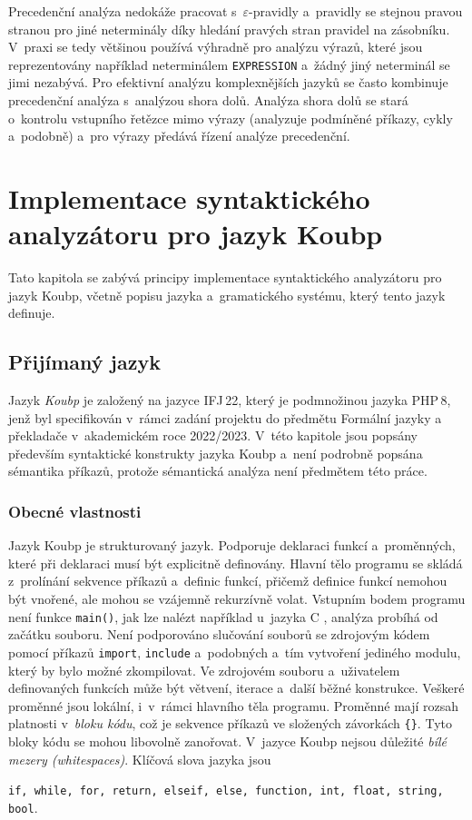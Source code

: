 Precedenční analýza nedokáže pracovat s~$\varepsilon$-pravidly a~pravidly se stejnou pravou stranou pro jiné neterminály díky hledání pravých stran pravidel na zásobníku.
V~praxi se tedy většinou používá výhradně pro analýzu výrazů, které jsou reprezentovány například neterminálem \texttt{EXPRESSION} a~žádný jiný neterminál se jimi nezabývá.
Pro efektivní analýzu komplexnějších jazyků se často kombinuje precedenční analýza s~analýzou shora dolů.
Analýza shora dolů se stará o~kontrolu vstupního řetězce mimo výrazy (analyzuje podmíněné příkazy, cykly a~podobně) a~pro výrazy předává řízení analýze precedenční.

\cleardoublepage

\chapter{Implementace syntaktického analyzátoru pro jazyk Koubp}\label{kap_implementace}

Tato kapitola se zabývá principy implementace syntaktického analyzátoru pro jazyk Koubp, včetně popisu jazyka a~gramatického systému, který tento jazyk definuje.
\section{Přijímaný jazyk}\label{kap_prijimany_jazyk}

Jazyk \emph{Koubp} je založený na jazyce IFJ\,22, který je podmnožinou jazyka PHP\,8, jenž byl specifikován v~rámci zadání projektu do předmětu Formální jazyky a překladače v~akademickém roce 2022/2023.
V~této kapitole jsou popsány především syntaktické konstrukty jazyka Koubp a~není podrobně popsána sémantika příkazů, protože sémantická analýza není předmětem této práce.

\subsection*{Obecné vlastnosti}
Jazyk Koubp je strukturovaný jazyk.
Podporuje deklaraci funkcí a~proměnných, které při deklaraci musí být explicitně definovány.
Hlavní tělo programu se skládá z~prolínání sekvence příkazů a~definic funkcí, přičemž definice funkcí nemohou být vnořené, ale mohou se vzájemně rekurzívně volat.
Vstupním bodem programu není funkce \texttt{main()}, jak lze nalézt například u~jazyka C \cite{ISO-C-Standard}, analýza probíhá od začátku souboru.
Není podporováno slučování souborů se zdrojovým kódem pomocí příkazů \texttt{import}, \texttt{include} a~podobných a~tím vytvoření jediného modulu, který by bylo možné zkompilovat.
Ve zdrojovém souboru a~uživatelem definovaných funkcích může být větvení, iterace a~další běžné konstrukce.
Veškeré proměnné jsou lokální, i~v~rámci hlavního těla programu.
Proměnné mají rozsah platnosti v~\emph{bloku kódu}, což je sekvence příkazů ve složených závorkách \texttt{\{\}}.
Tyto bloky kódu se mohou libovolně zanořovat.
V~jazyce Koubp nejsou důležité \emph{bílé mezery (whitespaces)}.
Klíčová slova jazyka jsou
\begin{center}
    \texttt{if, while, for, return, elseif, else, function, int, float, string, bool}.
\end{center}

